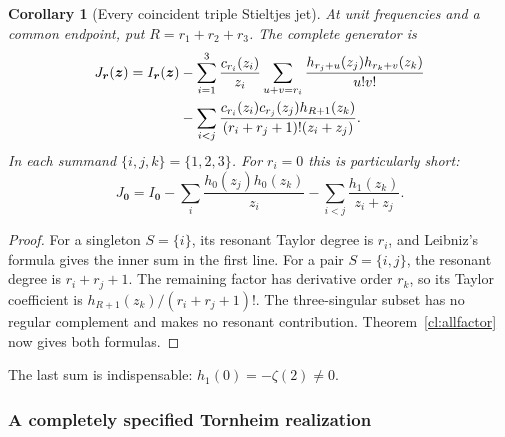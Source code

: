\documentclass[11pt,a4paper]{article}
\numberwithin{equation}{section}
\newtheorem{corollary}[theorem]{Corollary}
\theoremstyle{definition}
\theoremstyle{remark}
\begin{document}
\begin{corollary}[Every coincident triple Stieltjes jet]
\label{cl:triple-completion}
At unit frequencies and a common endpoint, put $R=r_1+r_2+r_3$.
The complete generator is
\begin{align}
 J_{\boldsymbol r}(\boldsymbol z)=I_{\boldsymbol r}(\boldsymbol z)
 &-\sum_{i=1}^3\frac{c_{r_i}(z_i)}{z_i}
     \sum_{u+v=r_i}\frac{h_{r_j+u}(z_j)h_{r_k+v}(z_k)}{u!v!}\notag\\
 &-\sum_{i<j}\frac{c_{r_i}(z_i)c_{r_j}(z_j)h_{R+1}(z_k)}
          {(r_i+r_j+1)!(z_i+z_j)}.\label{cl:triple-generator}
\end{align}
In each summand $\{i,j,k\}=\{1,2,3\}$.
For $r_i=0$ this is particularly short:
\begin{equation}\label{cl:triple-zero}
 J_{\boldsymbol0}=I_{\boldsymbol0}
 -\sum_i\frac{h_0(z_j)h_0(z_k)}{z_i}
 -\sum_{i<j}\frac{h_1(z_k)}{z_i+z_j}.
\end{equation}
\end{corollary}
\begin{proof}
For a singleton $S=\{i\}$, its resonant Taylor degree is $r_i$,
and Leibniz's formula gives the inner sum in the first line.
For a pair $S=\{i,j\}$, the resonant degree is $r_i+r_j+1$.
The remaining factor has derivative order $r_k$, so its Taylor
coefficient is $h_{R+1}(z_k)/(r_i+r_j+1)!$. The three-singular
subset has no regular complement and makes no resonant contribution.
Theorem~\ref{cl:allfactor} now gives both formulas.
\end{proof}
The last sum is indispensable: $h_1(0)=-\zeta(2)\ne0$.

\subsubsection{A completely specified Tornheim realization}
\label{cl:tornheim}
\end{document}
